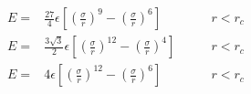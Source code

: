 \documentclass[12pt]{article}
\begin{document}
\begin{eqnarray*}
 E = & \frac{27}{4} \epsilon \left[ \left(\frac{\sigma}{r}\right)^{9} - 
                       \left(\frac{\sigma}{r}\right)^6 \right] &
                       \qquad r < r_c \\
 E = & \frac{3\sqrt{3}}{2} \epsilon \left[ \left(\frac{\sigma}{r}\right)^{12} - 
                       \left(\frac{\sigma}{r}\right)^4 \right] &
                       \qquad r < r_c \\
 E = &  4 \epsilon  \left[ \left(\frac{\sigma}{r}\right)^{12} - 
                       \left(\frac{\sigma}{r}\right)^6 \right] &
                       \qquad r < r_c
\end{eqnarray*}
\end{document}
